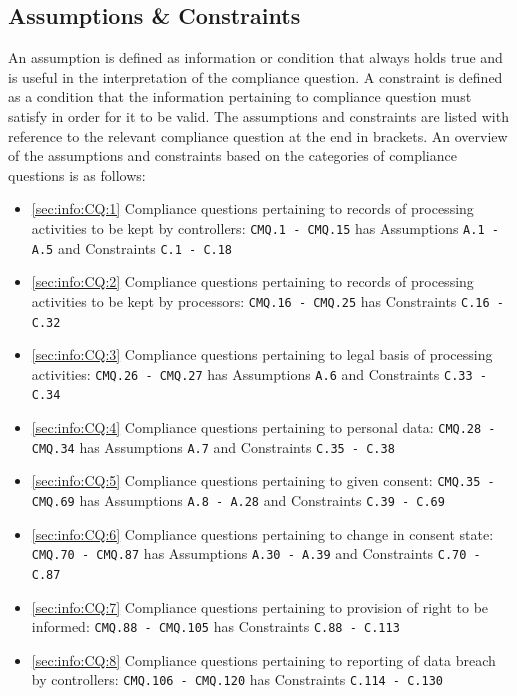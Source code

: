 \subsection{Assumptions \& Constraints}\label{sec:info:constraints}
An assumption is defined as information or condition that always holds true and is useful in the interpretation of the compliance question. A constraint is defined as a condition that the information pertaining to compliance question must satisfy in order for it to be valid. The assumptions and constraints are listed with reference to the relevant compliance question at the end in brackets.
An overview of the assumptions and constraints based on the categories of compliance questions is as follows:
\begin{itemize}
	\item \autoref{sec:info:CQ:1} Compliance questions pertaining to records of processing activities to be kept by controllers: \texttt{CMQ.1 - CMQ.15}  has Assumptions \texttt{A.1 - A.5} and Constraints \texttt{C.1 - C.18}
	\item \autoref{sec:info:CQ:2} Compliance questions pertaining to records of processing activities to be kept by processors: \texttt{CMQ.16 - CMQ.25} has Constraints \texttt{C.16 - C.32}
	\item \autoref{sec:info:CQ:3} Compliance questions pertaining to legal basis of processing activities: \texttt{CMQ.26 - CMQ.27}  has Assumptions \texttt{A.6} and Constraints \texttt{C.33 - C.34}
	\item \autoref{sec:info:CQ:4} Compliance questions pertaining to personal data: \texttt{CMQ.28 - CMQ.34}  has Assumptions \texttt{A.7} and Constraints \texttt{C.35 - C.38}
	\item \autoref{sec:info:CQ:5} Compliance questions pertaining to given consent: \texttt{CMQ.35 - CMQ.69}  has Assumptions \texttt{A.8 - A.28} and Constraints \texttt{C.39 - C.69}
	\item \autoref{sec:info:CQ:6} Compliance questions pertaining to change in consent state: \texttt{CMQ.70 - CMQ.87}  has Assumptions \texttt{A.30 - A.39} and Constraints \texttt{C.70 - C.87}
	\item \autoref{sec:info:CQ:7} Compliance questions pertaining to provision of right to be informed: \texttt{CMQ.88 - CMQ.105} has Constraints \texttt{C.88 - C.113}
	\item \autoref{sec:info:CQ:8} Compliance questions pertaining to reporting of data breach by controllers: \texttt{CMQ.106 - CMQ.120} has Constraints \texttt{C.114 - C.130}
\end{itemize} 

